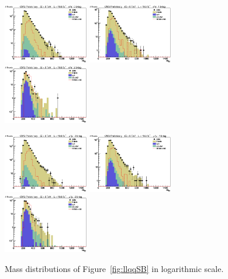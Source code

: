\begin{figure}[htb]
\begin{center}
\centerline{
\includegraphics[width=0.33\textwidth]{presentation/defense/images/final/0/el/mZZ_sideband_log.eps}
\includegraphics[width=0.33\textwidth]{presentation/defense/images/final/1/el/mZZ_sideband_log.eps}
\includegraphics[width=0.33\textwidth]{presentation/defense/images/final/2/el/mZZ_sideband_log.eps}
}
\centerline{
\includegraphics[width=0.33\textwidth]{presentation/defense/images/final/0/mu/mZZ_sideband_log.eps}
\includegraphics[width=0.33\textwidth]{presentation/defense/images/final/1/mu/mZZ_sideband_log.eps}
\includegraphics[width=0.33\textwidth]{presentation/defense/images/final/2/mu/mZZ_sideband_log.eps}
}
\caption{Mass distributions of Figure~\ref{fig:llqqSB} in logarithmic scale.}
\label{fig:llqqSBLOG}
\end{center}
\end{figure}

